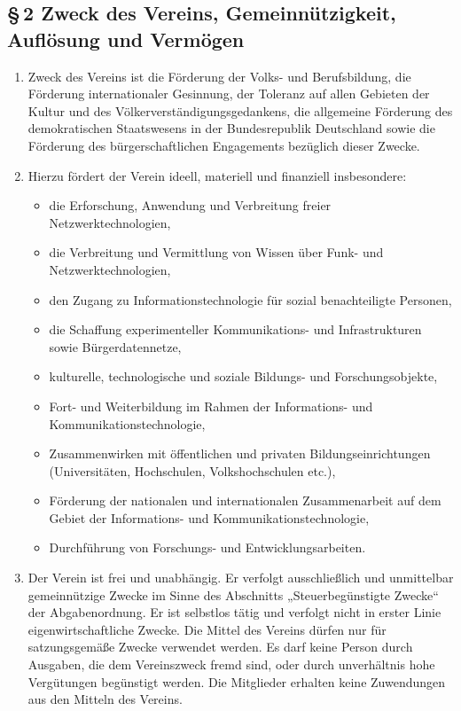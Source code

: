 \documentclass[12pt,a4paper]{article}
\begin{document}
\subsection*{§\,2 Zweck des Vereins, Gemeinnützigkeit, Auflösung und Vermögen}
\begin{enumerate}
\item Zweck des Vereins ist die Förderung der Volks- und Berufsbildung, die Förderung internationaler Gesinnung, der Toleranz auf allen Gebieten der Kultur und des Völkerverständigungsgedankens, die allgemeine Förderung des demokratischen Staatswesens in der Bundesrepublik Deutschland sowie die Förderung des bürgerschaftlichen Engagements bezüglich dieser Zwecke.
\item Hierzu fördert der Verein ideell, materiell und finanziell insbesondere:
\begin{itemize}
\item die Erforschung, Anwendung und Verbreitung freier Netzwerktechnologien,
\item die Verbreitung und Vermittlung von Wissen über Funk- und Netzwerktechnologien,
\item den Zugang zu Informationstechnologie für sozial benachteiligte Personen,
\item die Schaffung experimenteller Kommunikations- und Infrastrukturen sowie Bürgerdatennetze,
\item kulturelle, technologische und soziale Bildungs- und Forschungsobjekte,
\item Fort- und Weiterbildung im Rahmen der Informations- und Kommunikationstechnologie,
\item Zusammenwirken mit öffentlichen und privaten Bildungseinrichtungen (Universitäten, Hochschulen, Volkshochschulen etc.),
\item Förderung der nationalen und internationalen Zusammenarbeit auf dem Gebiet der Informations- und Kommunikationstechnologie,
\item Durchführung von Forschungs- und Entwicklungsarbeiten.
\end{itemize}
\item Der Verein ist frei und unabhängig. Er verfolgt ausschließlich und unmittelbar gemeinnützige Zwecke im Sinne des Abschnitts „Steuerbegünstigte Zwecke“ der Abgabenordnung. Er ist selbstlos tätig und verfolgt nicht in erster Linie eigenwirtschaftliche Zwecke. Die Mittel des Vereins dürfen nur für satzungsgemäße Zwecke verwendet werden. Es darf keine Person durch Ausgaben, die dem Vereinszweck fremd sind, oder durch unverhältnis hohe Vergütungen begünstigt werden. Die Mitglieder erhalten keine Zuwendungen aus den Mitteln des Vereins.

\end{enumerate}
\end{document}
